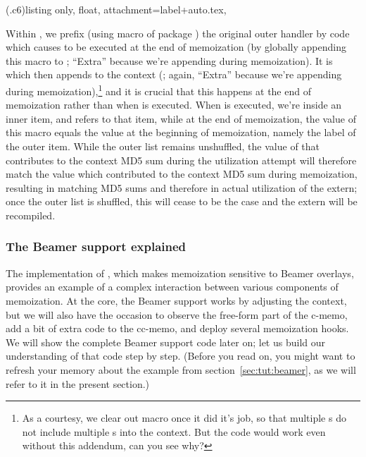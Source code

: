 \documentclass[a4paper,11pt]{article}
\begin{document}
(.c6){listing only, float,
  attachment=label+auto.tex,
}

Within , we prefix (using macro  of package
) the original outer handler  by code
which causes  to be executed at the end of memoization
(by globally appending this macro to ;
``Extra'' because we're appending during memoization).  It is
 which then appends  to the
context (; again, ``Extra'' because we're appending
during memoization),\footnote{As a courtesy, we clear out macro
   once it did it's job, so that multiple s
  do not include multiple s into the context.  But the code
  would work even without this addendum, can you see why?} and it is crucial
that this happens at the end of memoization rather than when  is
executed.  When  is executed, we're inside an inner item, and
 refers to that item, while at the end of memoization, the
value of this macro equals the value at the beginning of memoization, namely
the label of the outer item.  While the outer list remains unshuffled, the
value of  that contributes to the context MD5 sum during
the utilization attempt will therefore match the value which contributed to the
context MD5 sum during memoization, resulting in matching MD5 sums and
therefore in actual utilization of the extern; once the outer list is shuffled,
this will cease to be the case and the extern will be recompiled.


\subsubsection{The Beamer support explained}
\label{sec:per-overlay}

The implementation of , which makes memoization sensitive
to Beamer overlays, provides an example of a complex interaction between
various components of memoization.  At the core, the Beamer support works by
adjusting the context, but we will also have the occasion to observe the
free-form part of the c-memo, add a bit of extra code to the cc-memo, and
deploy several memoization hooks.  We will show the complete Beamer support
code later on; let us build our understanding of that code step by step.
(Before you read on, you might want to refresh your memory about the 
example from section~\ref{sec:tut:beamer}, as we will refer to it in the
present section.)
\end{document}
